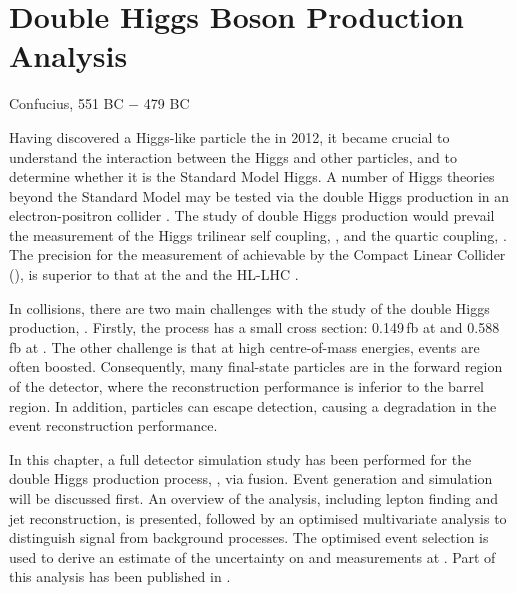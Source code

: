 \chapter{Double Higgs Boson Production Analysis}
\label{chap:DoubleHiggs}

%
{Confucius, 551 BC $-$ 479 BC}%


Having discovered a Higgs-like particle the \LHC in 2012\cite{Aad:2012tfa,Chatrchyan:2012ufa}, it became  crucial to understand the interaction between the Higgs and other particles, and  to determine whether it is the Standard Model Higgs. A number of Higgs theories beyond the Standard Model may be tested via the double Higgs production in an electron-positron collider \cite{Kaplan:1983fs,Goldberger:2008zz}. The study of double Higgs production would prevail the  measurement of the Higgs trilinear self coupling, \gHHH, and the quartic coupling, \gWWHH. The precision for the measurement of \gHHH achievable by the Compact Linear Collider (\CLIC), is superior to that at the \LHC and the HL-LHC  \cite{Contino:2013gna}.


In \ee collisions, there are two main challenges with the study of the double Higgs production,  \eeToHH. Firstly, the process has a small cross section: 0.149\,fb at  and 0.588\,fb at . The other challenge is that at high centre-of-mass energies, events are often boosted.  Consequently, many final-state particles are in the forward region of the detector, where the reconstruction performance is inferior to the barrel region. In addition, particles can escape detection, causing a degradation in the event reconstruction performance.


In this chapter, a full \CLICILD detector simulation study has been performed for the double Higgs production process, \eeToHH, via \WW fusion. Event generation and simulation will be discussed first. An overview of the analysis, including lepton finding and jet reconstruction, is presented, followed by an optimised multivariate analysis to distinguish signal from background processes. The optimised event selection is used to derive an estimate of the uncertainty on  \gHHH and \gWWHH measurements at \CLIC. Part  of this analysis has been published in \cite{Abramowicz:2016zbo}.

